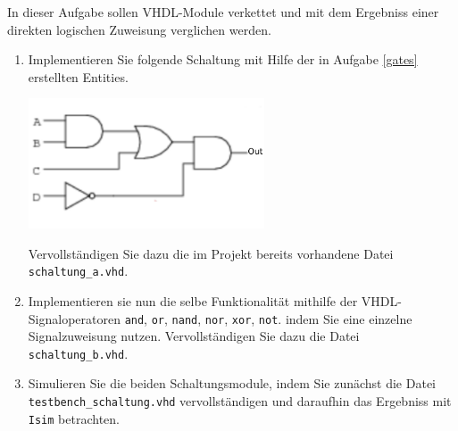 \documentclass[12pt]{article}
\begin{document}


In dieser Aufgabe sollen VHDL-Module verkettet und mit dem Ergebniss einer direkten logischen Zuweisung verglichen werden.

\begin{enumerate}[label=\alph*.)]


\item Implementieren Sie folgende Schaltung mit Hilfe der in
  Aufgabe \ref{gates} erstellten Entities.
  \begin{center}
    \includegraphics[width= 7cm]{./images/01301x01}
  \end{center}
\vspace*{-25pt}
Vervollständigen Sie dazu die im Projekt bereits vorhandene Datei \texttt{schaltung\_a.vhd}.


\item Implementieren sie nun die selbe Funktionalität mithilfe der VHDL-Signaloperatoren
  \texttt{and}, \texttt{or}, \texttt{nand}, \texttt{nor}, \texttt{xor}, \texttt{not}.
 indem Sie eine einzelne Signalzuweisung nutzen.
 Vervollständigen Sie dazu die Datei \texttt{schaltung\_b.vhd}.


\item Simulieren Sie die beiden Schaltungsmodule, indem Sie zunächst die Datei \texttt{testbench\_schaltung.vhd}
vervollständigen und daraufhin das Ergebniss mit \texttt{Isim} betrachten.


\end{enumerate}




\clearpage
\end{document}
